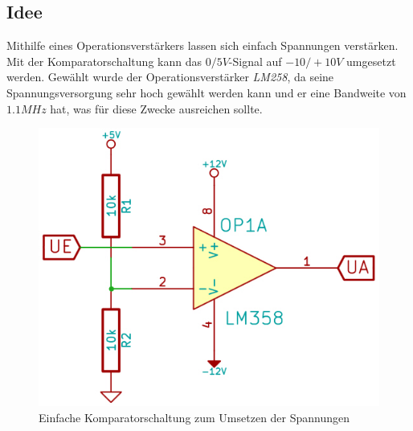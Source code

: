 \subsection{Idee} %
Mithilfe eines Operationsverstärkers lassen sich einfach Spannungen verstärken. Mit der Komparatorschaltung kann das $0/5V$-Signal auf $-10/+10V$ umgesetzt werden. Gewählt wurde der Operationsverstärker \textit{LM258}, da seine Spannungsversorgung sehr hoch gewählt werden kann und er eine Bandweite von $1.1MHz$ hat, was für diese Zwecke ausreichen sollte.
\begin{figure}[H]
\centering
\includegraphics[scale=0.5]{images/komparatorschaltung.jpg}
\caption{Einfache Komparatorschaltung zum Umsetzen der Spannungen} \label{img:I1} %
\end{figure}

